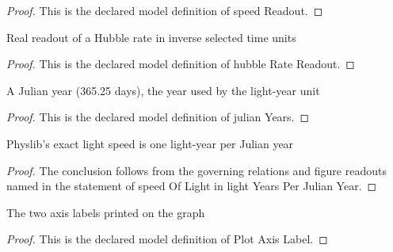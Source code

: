 \begin{proof}
  This is the declared model definition of speed Readout.
\end{proof}
\begin{definition}
  \label{def:physics:phyx-mini-0923:phyxminiproblems-problemphyxmini0923-hubbleratereadout}
  Real readout of a Hubble rate in inverse selected time units
\end{definition}
\begin{proof}
  This is the declared model definition of hubble Rate Readout.
\end{proof}
\begin{definition}
  \label{def:physics:phyx-mini-0923:phyxminiproblems-problemphyxmini0923-julianyears}
  A Julian year (365.25 days), the year used by the light-year unit
\end{definition}
\begin{proof}
  This is the declared model definition of julian Years.
\end{proof}
\begin{lemma}
  \label{lem:physics:phyx-mini-0923:phyxminiproblems-problemphyxmini0923-speedoflight-in-lightyearsperjulianyear}
  Physlib's exact light speed is one light-year per Julian year
\end{lemma}
\begin{proof}
  The conclusion follows from the governing relations and figure readouts named in the statement of speed Of Light in light Years Per Julian Year.
\end{proof}
\begin{definition}
  \label{def:physics:phyx-mini-0923:phyxminiproblems-problemphyxmini0923-plotaxislabel}
  The two axis labels printed on the graph
\end{definition}
\begin{proof}
  This is the declared model definition of Plot Axis Label.
\end{proof}
